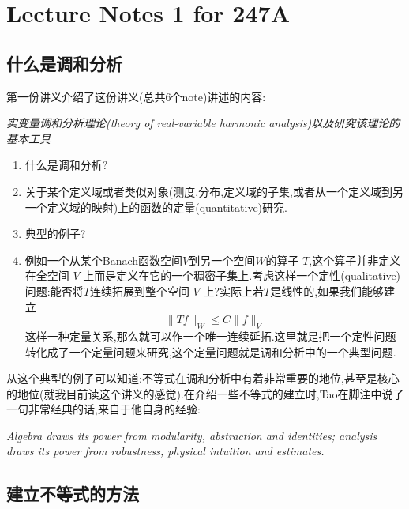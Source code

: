 \section{Lecture Notes 1 for 247A}
\subsection{什么是调和分析}
第一份讲义介绍了这份讲义(总共6个note)讲述的内容:
\begin{framed}
\begin{center}
  \textit{实变量调和分析理论(theory of real-variable harmonic analysis)以及研究该理论的基本工具}
\end{center}
\end{framed}
\begin{enumerate}
  \item 什么是调和分析?
  \item [] 关于某个定义域或者类似对象(测度,分布,定义域的子集,或者从一个定义域到另一个定义域的映射)上的函数的定量(quantitative)研究.
  \item 典型的例子?
  \item [] 例如一个从某个Banach函数空间$V$到另一个空间$W$的算子 $T$,这个算子并非定义在全空间 $V$ 上而是定义在它的一个稠密子集上.考虑这样一个定性(qualitative)问题:能否将$T$连续拓展到整个空间 $V$ 上?实际上若$T$是线性的,如果我们能够建立
    \[
    \|Tf\|_{W}\le C\|f\|_{V}
    \] 
    这样一种定量关系,那么就可以作一个唯一连续延拓.这里就是把一个定性问题转化成了一个定量问题来研究,这个定量问题就是调和分析中的一个典型问题.
\end{enumerate}

从这个典型的例子可以知道:不等式在调和分析中有着非常重要的地位,甚至是核心的地位(就我目前读这个讲义的感觉).在介绍一些不等式的建立时,Tao在脚注中说了一句非常经典的话,来自于他自身的经验:
\begin{framed}
\begin{center}
  \textit{Algebra draws its power from modularity, abstraction and identities; analysis draws its power from robustness, physical intuition and estimates.}
\end{center}
\end{framed}

\subsection{建立不等式的方法}

